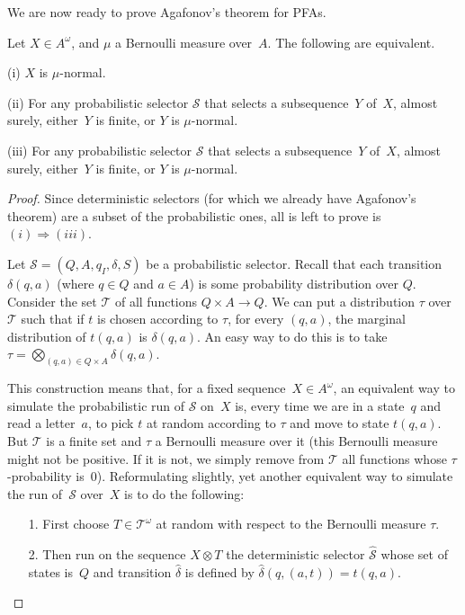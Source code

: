\documentclass[11pt]{article}
\renewcommand{\S}{\mathcal{S}}
\begin{document}
We are now ready to prove Agafonov's theorem for PFAs. 

\begin{theorem}\label{thm:agafonov-pfa}
Let $X \in A^\omega$, and $\mu$ a Bernoulli measure over~$A$. The following are equivalent.
\item[(i)] $X$ is $\mu$-normal. 
\item[(ii)] For any probabilistic selector $\S$ that selects a subsequence~$Y$ of~$X$, almost surely, either~$Y$ is finite, or $Y$ is $\mu$-normal. 
\item[(iii)] For any probabilistic selector $\S$ that selects a subsequence~$Y$ of~$X$, almost surely, either~$Y$ is finite, or $Y$ is $\mu$-normal. 
\end{theorem}

\begin{proof}
Since deterministic selectors (for which we already have Agafonov's theorem) are a subset of the probabilistic ones, all is left to prove is $(i) \Rightarrow (iii)$. 

Let $\S=(Q,A,q_I,\delta,S)$ be a probabilistic selector. Recall that each transition $\delta(q,a)$ (where $q \in Q$ and $a \in A$) is some probability distribution over $Q$. Consider the set $\mathcal{T}$ of all functions $Q \times A \rightarrow Q$. We can put a distribution $\tau$ over~$\mathcal{T}$ such that if $t$ is chosen according to $\tau$, for every $(q,a)$, the marginal distribution of $t(q,a)$ is $\delta(q,a)$. An easy way to do this is to take $\tau= \bigotimes_{(q,a)\in Q \times A} \delta(q,a)$.

This construction means that, for a fixed sequence~$X \in A^\omega$, an equivalent way to simulate the probabilistic run of $\S$ on~$X$ is, every time we are in a state~$q$ and read a letter~$a$, to pick $t$ at random according to $\tau$ and move to state $t(q,a)$. But $\mathcal{T}$ is a finite set and $\tau$ a Bernoulli measure over it (this Bernoulli measure might not be positive. If it is not, we simply remove from $\mathcal{T}$ all functions whose $\tau$-probability is~$0$). Reformulating slightly, yet another equivalent way to simulate the run of~$\S$ over~$X$ is to do the following:
\begin{itemize}
\item[1.] First choose $T \in \mathcal{T}^\omega$ at random with respect to the Bernoulli measure $\tau$. 
\item[2.] Then run on the sequence $X \otimes T$ the deterministic selector $\hat{\mathcal{S}}$ whose set of states is~$Q$ and transition $\hat{\delta}$ is defined by $\hat{\delta}(q,(a,t))=t(q,a)$. 
\end{itemize}


\end{proof}
\end{document}
